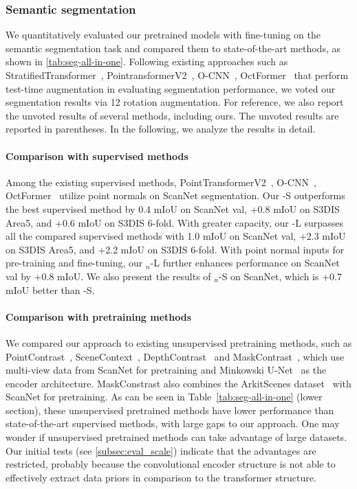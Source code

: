 \documentclass[10pt,twocolumn,letterpaper]{article}
\begin{document}
\subsubsection{Semantic segmentation}\label{subsubsec:exp_segmentation}
We quantitatively evaluated our pretrained models with fine-tuning on the semantic segmentation task and compared them to state-of-the-art methods, as shown in \cref{tab:seg-all-in-one}. Following existing approaches such as StratifiedTransformer~\cite{lai2022stratified}, PointransformerV2~\cite{wu2022point}, O-CNN~\cite{Wang2017}, OctFormer~\cite{octformer} that perform test-time augmentation in evaluating segmentation performance, we voted our segmentation results via 12 rotation augmentation. For reference, we also report the unvoted results of several methods, including ours. The unvoted results are reported in parentheses.
In the following, we analyze the results in detail.

\paragraph{Comparison with supervised methods}
Among the existing supervised methods, PointTransformerV2~\cite{wu2022point}, O-CNN~\cite{Wang2017}, OctFormer~\cite{octformer} utilize point normals on ScanNet segmentation.
Our \SST-S outperforms the best supervised method by 0.4 mIoU on ScanNet val, +0.8 mIoU on S3DIS Area5, and +0.6 mIoU on S3DIS 6-fold. With greater capacity, our \SST-L surpasses all the compared supervised methods with 1.0 mIoU on ScanNet val, +2.3 mIoU on S3DIS Area5, and +2.2 mIoU on S3DIS 6-fold. With point normal inputs for pre-training and fine-tuning, our \SST$_n$-L further enhances performance on ScanNet val by +0.8 mIoU. We also present the results of \SST$_n$-S on ScanNet, which is +0.7 mIoU better than \SST-S.

\paragraph{Comparison with pretraining methods}
We compared our approach to existing unsupervised pretraining methods, such as PointContrast~\cite{Xie2020}, SceneContext~\cite{hou2020efficient},  DepthContrast~\cite{zhang2021self} and MaskContrast~\cite{wu2023masked}, which use multi-view data from ScanNet for pretraining and Minkowski U-Net~\cite{choy20194d} as the encoder architecture.  MaskConstrast also combines the ArkitScenes dataset~\cite{ARKitScenes} with ScanNet for pretraining. As can be seen in Table~\ref{tab:seg-all-in-one} (lower section), these unsupervised pretrained methods have lower performance than state-of-the-art supervised methods, with large gaps to our approach.  One may wonder if unsupervised pretrained methods can take advantage of large datasets. Our initial tests (see \cref{subsec:eval_scale}) indicate that the advantages are restricted, probably because the convolutional encoder structure is not able to effectively extract data priors in comparison to the transformer structure.
\end{document}
